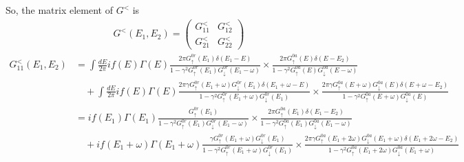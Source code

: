 \documentclass[11pt,a4paper]{article}
\begin{document}
So, the matrix element of $G^{<}$ is
\begin{equation}
\begin{split}
G^{<}\left(E_{1}, E_{2}\right) =
\left(\begin{array}{cc}
G_{11}^{<} & G_{12}^{<} \\
G_{21}^{<} & G_{22}^{<}
\end{array}\right)
\end{split}
\end{equation}
\begin{equation}
\begin{split}
G_{11}^{<}(E_{1},E_{2})&=\int \frac{d E}{2 \pi} i f(E) \Gamma(E) \frac{2 \pi G_{ \uparrow}^{0r}\left(E_{1}\right) \delta\left(E_{1}-E\right)}{1-\gamma^{2} G_{ \uparrow}^{0r}\left(E_{1}\right) G_{ \downarrow}^{0r}\left(E_{1}-\omega\right)} \times 
\frac{2 \pi G_{ \uparrow}^{0a}\left(E\right) \delta\left(E-E_{2}\right)} {1-\gamma^{2} G_{ \uparrow}^{0a}\left(E\right) G_{ \downarrow}^{0a}\left(E-\omega\right)} \\
&\quad+ \int \frac{d E}{2 \pi} i f(E) \Gamma(E) \frac{2 \pi\gamma G_{ \uparrow}^{0r}\left(E_{1}+\omega\right) G_{ \downarrow}^{0r} \left(E_{1}\right) \delta(E_{1}+\omega-E) }{1-\gamma^{2} G_{ \uparrow}^{0r}\left(E_{1}+\omega\right) G_{ \downarrow}^{0r}\left(E_{1}\right)} \times
\frac{2 \pi\gamma G_{ \uparrow}^{0a}\left(E+\omega\right) G_{ \downarrow}^{0a} \left(E\right) \delta(E+\omega-E_{2}) }{1-\gamma^{2} G_{ \uparrow}^{0a}\left(E+\omega\right) G_{ \downarrow}^{0a}\left(E\right)} \\
&= i f(E_{1}) \Gamma(E_{1}) \frac{ G_{ \uparrow}^{0r}\left(E_{1}\right) }{1-\gamma^{2} G_{ \uparrow}^{0r}\left(E_{1}\right) G_{ \downarrow}^{0r}\left(E_{1}-\omega\right)} \times 
\frac{2 \pi G_{ \uparrow}^{0a}\left(E_{1}\right) \delta\left(E_{1}-E_{2}\right)} {1-\gamma^{2} G_{ \uparrow}^{0a}\left(E_{1}\right) G_{ \downarrow}^{0a}\left(E_{1}-\omega\right)} \\
&\quad+ i f(E_{1}+\omega) \Gamma(E_{1}+\omega) \frac{\gamma G_{ \uparrow}^{0r}\left(E_{1}+\omega\right) G_{ \downarrow}^{0r} \left(E_{1}\right)  }{1-\gamma^{2} G_{ \uparrow}^{0r}\left(E_{1}+\omega\right) G_{ \downarrow}^{0r}\left(E_{1}\right)} \times
\frac{2 \pi\gamma G_{ \uparrow}^{0a}\left(E_{1}+2\omega\right) G_{ \downarrow}^{0a} \left(E_{1}+\omega\right) \delta(E_{1}+2\omega-E_{2}) }{1-\gamma^{2} G_{ \uparrow}^{0a}\left(E_{1}+2\omega\right) G_{ \downarrow}^{0a}\left(E_{1}+\omega\right)}
\end{split}
\end{equation}
\end{document}
